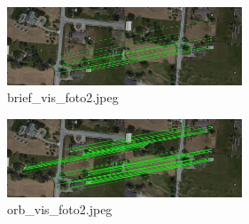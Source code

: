 \documentclass[twoside,twocolumn]{article}
\begin{document}
\begin{figure}[H]
\begin{center}
	\includegraphics[width=7cm]{figures/brief_vis_foto2.jpeg}
\caption{brief\_vis\_foto2.jpeg} \label{brief_vis_foto2}
\end{center}
\end{figure}

\begin{figure}[H]
\begin{center}
	\includegraphics[width=7cm]{figures/orb_vis_foto2.jpeg}
\caption{orb\_vis\_foto2.jpeg} \label{orb_vis_foto2}
\end{center}
\end{figure}
\end{document}
